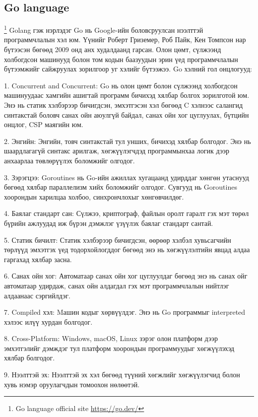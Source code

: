 \subsection{Go language}
	\footnote{Go language official site \url{https://go.dev/}}
		\quad \quad Golang гэж нэрлэдэг Go нь Google-ийн боловсруулсан нээлттэй программчлалын хэл юм. Үүнийг Роберт Гриземер, Роб Пайк, Кен Томпсон нар бүтээсэн бөгөөд 2009 онд анх худалдаанд гарсан. Олон цөмт, сүлжээнд холбогдсон машинууд болон том кодын баазуудын эрин үед программчлалын бүтээмжийг сайжруулах зорилгоор уг хэлийг бүтээжээ. Go хэлний гол онцлогууд:

		1. Concurrent and Concurrent: Go нь олон цөмт болон сүлжээнд холбогдсон машинуудаас хамгийн ашигтай программ бичихэд хялбар болгох зорилготой юм. Энэ нь статик хэлбэрээр бичигдсэн, эмхэтгэсэн хэл бөгөөд C хэлнээс салангид синтакстай боловч санах ойн аюулгүй байдал, санах ойн хог цуглуулах, бүтцийн онцлог, CSP маягийн юм.
		
		2. Энгийн: Энгийн, товч синтакстай тул унших, бичихэд хялбар болгодог. Энэ нь шаардлагагүй синтакс арилгаж, хөгжүүлэгчдэд программынхаа логик дээр анхаарлаа төвлөрүүлэх боломжийг олгодог.
		
		3. Зэрэгцээ: Goroutines нь Go-ийн ажиллах хугацаанд удирддаг хөнгөн утаснууд бөгөөд хялбар параллелизм хийх боломжийг олгодог. Сувгууд нь Goroutines хоорондын харилцаа холбоо, синхрончлохыг хөнгөвчилдөг.
		
		4. Баялаг стандарт сан: Сүлжээ, криптограф, файлын оролт гаралт гэх мэт төрөл бүрийн ажлуудад иж бүрэн дэмжлэг үзүүлэх баялаг стандарт сантай.
		
		5. Статик бичилт: Статик хэлбэрээр бичигдсэн, өөрөөр хэлбэл хувьсагчийн төрлүүд эмхэтгэх үед тодорхойлогддог бөгөөд энэ нь хөгжүүлэлтийн явцад алдаа гаргахад хялбар засна.
		
		6. Санах ойн хог: Автоматаар санах ойн хог цуглуулдаг бөгөөд энэ нь санах ойг автоматаар удирдаж, санах ойн алдагдал гэх мэт программчлалын нийтлэг алдаанаас сэргийлдэг.
		
		7. Compiled хэл: Mашин кодыг хөрвүүлдэг. Энэ нь Go программыг interpreted хэлээс илүү хурдан болгодог.
		
		8. Cross-Platform: Windows, macOS, Linux зэрэг олон платформ дээр эмхэтгэлийг дэмждэг тул платформ хоорондын программуудыг хөгжүүлэхэд хялбар болгодог.
		
		9. Нээлттэй эх: Нээлттэй эх хэл бөгөөд түүний хөгжлийг хөгжүүлэгчид болон хувь нэмэр оруулагчдын томоохон нөлөөтэй.
		
